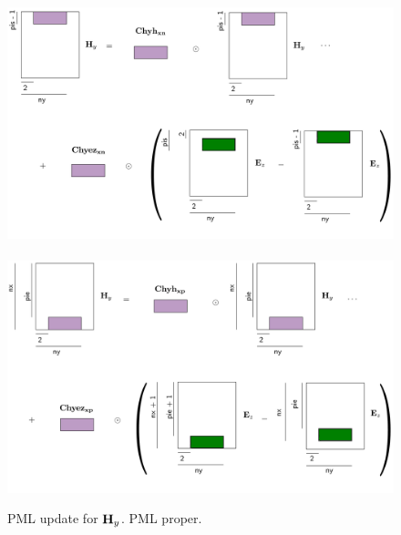 \documentclass[a4paper,12pt]{article}
\begin{document}
\begin{figure}
\centering
\includegraphics[width=1\textwidth]{../pics/tikz/svg/pml-color/Hy-pml-xn.pdf}
~
\includegraphics[width=1\textwidth]{../pics/tikz/svg/pml-color/Hy-pml-xp.pdf}
\caption{PML update for ${\bf H}_y$. PML proper.}
\end{figure}
%
%
\end{document}
